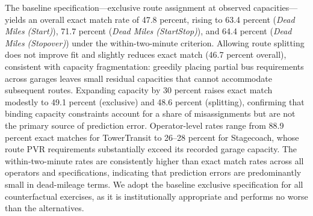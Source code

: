 \documentclass[12pt]{article}
\newcommand{\rootdir}{..}  %
\newcommand{\tables}{\rootdir/\rootdir/Output/tables}
\newcommand\fnote[1]{\captionsetup{font=small}\caption*{\emph{Notes}: #1}} %
\begin{document}
The baseline specification---exclusive route assignment at observed
capacities---yields an overall exact match rate of 47.8 percent, rising to
63.4 percent (\emph{Dead Miles (Start)}), 71.7 percent
(\emph{Dead Miles (StartStop)}), and 64.4 percent (\emph{Dead Miles
(Stopover)}) under the within-two-minute criterion. Allowing route splitting
does not improve fit and slightly reduces exact match (46.7 percent overall),
consistent with capacity fragmentation: greedily placing partial bus
requirements across garages leaves small residual capacities that cannot
accommodate subsequent routes. Expanding capacity by 30 percent raises exact
match modestly to 49.1 percent (exclusive) and 48.6 percent (splitting),
confirming that binding capacity constraints account for a share of
misassignments but are not the primary source of prediction error.
Operator-level rates range from 88.9 percent exact matches for TowerTransit
to 26--28 percent for Stagecoach, whose route PVR requirements substantially
exceed its recorded garage capacity. The within-two-minute rates are
consistently higher than exact match rates across all operators and
specifications, indicating that prediction errors are predominantly small in
dead-mileage terms. We adopt the baseline exclusive specification for all
counterfactual exercises, as it is institutionally appropriate and performs no
worse than the alternatives.
 
\begin{table}[!tb]
\caption{Validation of the route-garage assignment equation}\label{tab:assignment_validation}
\centering

\fnote{The assignment equation~\eqref{eq:assignment_buses} assigns routes
exclusively to garages owned by the same operator, sequentially by minimum
drive time to the route start stop subject to garage PVR capacity. Routes
are treated as indivisible: the full vehicle requirement must be met from a
single garage. The sample covers the last tender round, restricted to routes
with an observed operating garage of known capacity (584 routes, 8
operators). \textit{Exclusive route--garage mapping}: each route is assigned
to at most one garage; exact match requires agreement of predicted and
observed garage codes. \textit{Routes can spread over garages}: a route's
buses may be distributed across multiple garages of the same operator; exact
match requires the observed garage to appear in the predicted allocation.
\textit{Within 2 min} = the predicted garage's dead-mileage differs from the
observed garage's by at most 2 minutes, evaluated under three measures: drive
time to the route start stop (\emph{Dead Miles (Start)}), average of start
and end stop (\emph{Dead Miles (StartStop)}), and mean over intermediate
stopover stops (\emph{Dead Miles (Stopover)}).}
\end{table}
 
\end{document}
